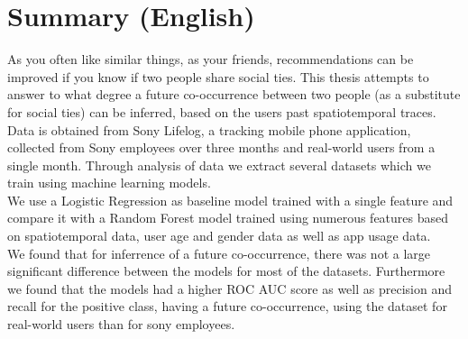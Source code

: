 \chapter{Summary (English)}
As you often like similar things, as your friends, recommendations can be improved if you know if two people share social ties.
This thesis attempts to answer to what degree a future co-occurrence between two people (as a substitute for social ties) can be inferred, based on the users past spatiotemporal traces. 
Data is obtained from Sony Lifelog, a tracking mobile phone application, collected from Sony employees over three months and real-world users from a single month.
Through analysis of data we extract several datasets which we train using machine learning models.\\
We use a Logistic Regression as baseline model trained with a single feature and compare it with a Random Forest model trained using numerous features based on spatiotemporal data, user age and gender data as well as app usage data. \\
We found that for inferrence of a future co-occurrence, there was not a large significant difference between the models for most of the datasets. Furthermore we found that the models had a higher ROC AUC score as well as precision and recall for the positive class, having a future co-occurrence, using the dataset for real-world users than for sony employees.